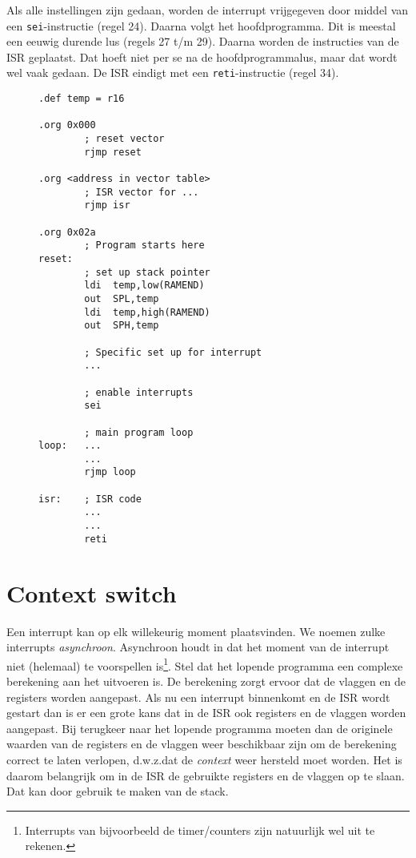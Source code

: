 Als alle instellingen zijn gedaan, worden de interrupt vrijgegeven door middel
van een \lstinline|sei|-instructie (regel 24). Daarna volgt het hoofdprogramma.
Dit is meestal een eeuwig durende lus (regels 27 t/m 29). Daarna worden de
instructies van de ISR geplaatst. Dat hoeft niet per se na de hoofdprogrammalus,
maar dat wordt wel vaak gedaan. De ISR eindigt met een \lstinline|reti|-instructie
(regel 34).

\begin{figure}[!t]
\begin{lstlisting}[language=AVRassembler,caption=Algemene opzet voor gebruik van interrupts.,label=cod:intgenericsetup]
.def temp = r16

.org 0x000
        ; reset vector
		rjmp reset

.org <address in vector table>
        ; ISR vector for ...
		rjmp isr

.org 0x02a
        ; Program starts here
reset:
		; set up stack pointer
		ldi	 temp,low(RAMEND)
		out	 SPL,temp
		ldi	 temp,high(RAMEND)
		out	 SPH,temp
		
        ; Specific set up for interrupt
        ...

		; enable interrupts
		sei

		; main program loop
loop:   ...
        ...
        rjmp loop

isr:    ; ISR code
        ...
        ...
 		reti
\end{lstlisting}
\end{figure}


\section{Context switch}
\label{sec:contextswitch}
Een interrupt kan op elk willekeurig moment plaatsvinden. We noemen zulke
interrupts \textsl{asynchroon}. Asynchroon houdt in dat het moment van
de interrupt niet (helemaal) te voorspellen is\footnote{Interrupts van
bijvoorbeeld de timer/counters zijn natuurlijk wel uit te rekenen.}. Stel
dat het lopende programma een complexe berekening aan het uitvoeren is.
De berekening zorgt ervoor dat de vlaggen en de registers worden aangepast.
Als nu een interrupt binnenkomt en de ISR wordt gestart dan is er een
grote kans dat in de ISR ook registers en de vlaggen worden aangepast.
Bij terugkeer naar het lopende programma moeten dan de originele waarden
van de registers en de vlaggen weer beschikbaar zijn om de berekening
correct te laten verlopen, d.w.z.\@ dat de \textsl{context} weer hersteld
moet worden. Het is daarom belangrijk om in de ISR de gebruikte registers
en de vlaggen op te slaan. Dat kan door gebruik te maken van de stack. 

